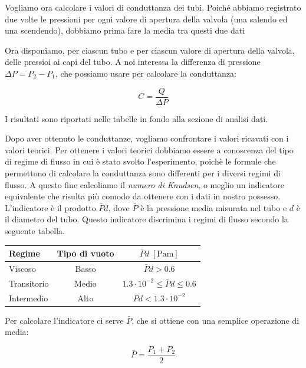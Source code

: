 Vogliamo ora calcolare i valori di conduttanza dei tubi. Poiché abbiamo registrato due volte le pressioni per ogni valore
di apertura della valvola (una salendo ed una scendendo), dobbiamo prima fare la media tra questi due dati

Ora disponiamo, per ciascun tubo e per ciascun valore di apertura della valvola, delle pressioi ai capi del tubo.
A noi interessa la differenza di pressione $\Delta P = P_2 - P_1$, che possiamo usare per calcolare la conduttanza:

\begin{equation}
    C = \frac{Q}{\Delta P}
\end{equation}

I risultati sono riportati nelle tabelle in fondo alla sezione di analisi dati.

Dopo aver ottenuto le conduttanze, vogliamo confrontare i valori ricavati con i valori teorici.
Per ottenere i valori teorici dobbiamo essere a conoscenza del tipo di regime di flusso in cui è stato svolto l'esperimento,
poichè le formule che permettono di calcolare la conduttanza sono differenti per i diversi regimi di flusso.
A questo fine calcoliamo il \emph{numero di Knudsen}, o meglio un indicatore equivalente che risulta più comodo da
ottenere con i dati in nostro possesso. L'indicatore è il prodotto $\bar{P}d$, dove $\bar{P}$ è la pressione media misurata nel
tubo e $d$ è il diametro del tubo. Questo indicatore discrimina i regimi di flusso secondo la seguente tabella.

\begin{center}
    \begin{tabular}{l c c}
        \toprule
        Regime & Tipo di vuoto & $\bar{P} d \; [\si{\pascal\metre}]$ \\
        \midrule
        Viscoso & Basso & $\bar{P} d > 0.6$ \\
        Transitorio & Medio & $1.3\cdot10^{-2} \le \bar{P} d \le 0.6$ \\
        Intermedio & Alto & $\bar{P} d < 1.3\cdot10^{-2}$ \\
        \bottomrule
    \end{tabular}
\end{center}

Per calcolare l'indicatore ci serve $\bar{P}$, che si ottiene con una semplice operazione di media:

\begin{equation}
    \bar{P} = \frac{P_1 + P_2}{2}
\end{equation}

